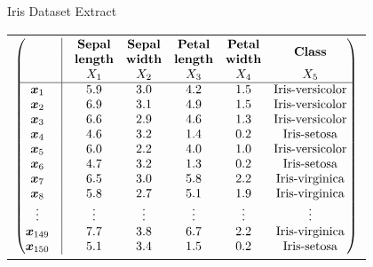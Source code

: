 \begin{frame}{Iris Dataset Extract}

\begin{center}
\begin{tabular}{c}
    $\matr{%
    & \vline & \textbf{Sepal}  & \textbf{Sepal}
    & \textbf{Petal} & \textbf{Petal}
    & \multirow{2}{*}{\textbf{Class}}\\
    & \vline & \textbf{length}  & \textbf{width}
    & \textbf{length} & \textbf{width} & \\
    & \vline & X_1 & X_2 & X_3 & X_4 & X_5\\
        \hline
        \bx_1 &\vline &  5.9 &3.0 &4.2 &1.5 &\text{Iris-versicolor}\\
        \bx_2 &\vline &  6.9 &3.1 &4.9 &1.5 &\text{Iris-versicolor}\\
        \bx_3 &\vline &  6.6 &2.9 &4.6 &1.3 &\text{Iris-versicolor}\\
        \bx_4 &\vline &  4.6 &3.2 &1.4 &0.2 &\text{Iris-setosa} \\
        \bx_5 &\vline &  6.0 &2.2 &4.0 &1.0 &\text{Iris-versicolor}\\
        \bx_6 &\vline &  4.7 &3.2 &1.3 &0.2 &\text{Iris-setosa}  \\
        \bx_7 &\vline &  6.5 &3.0 &5.8 &2.2 &\text{Iris-virginica} \\
        \bx_8 &\vline &  5.8 &2.7 &5.1 &1.9 &\text{Iris-virginica} \\
        \vdots & \vline & \vdots & \vdots & \vdots & \vdots &
        \vdots\\
        \bx_{149} & \vline&7.7 &3.8 &6.7 &2.2 & \text{Iris-virginica}\\
        \bx_{150} & \vline&5.1 &3.4 &1.5 &0.2 & \text{Iris-setosa}\\
    }%
    $
\end{tabular}
\end{center}
\end{frame}

